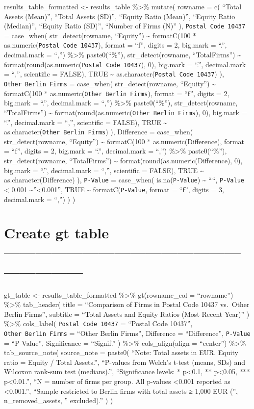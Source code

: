 \documentclass[
]{article}
\begin{document}
results\_table\_formatted \textless- results\_table \%\textgreater\%
mutate( rowname = c( ``Total Assets (Mean)'', ``Total Assets (SD)'',
``Equity Ratio (Mean)'', ``Equity Ratio (Median)'', ``Equity Ratio
(SD)'', ``Number of Firms (N)'' ), \texttt{Postal\ Code\ 10437} =
case\_when( str\_detect(rowname, ``Equity'') \textasciitilde{}
formatC(100 * as.numeric(\texttt{Postal\ Code\ 10437}), format = ``f'',
digits = 2, big.mark = ``.'', decimal.mark = ``,'') \%\textgreater\%
paste0(``\%''), str\_detect(rowname, ``Total\textbar Firms'')
\textasciitilde{} format(round(as.numeric(\texttt{Postal\ Code\ 10437}),
0), big.mark = ``.'', decimal.mark = ``,'', scientific = FALSE), TRUE
\textasciitilde{} as.character(\texttt{Postal\ Code\ 10437}) ),
\texttt{Other\ Berlin\ Firms} = case\_when( str\_detect(rowname,
``Equity'') \textasciitilde{} formatC(100 *
as.numeric(\texttt{Other\ Berlin\ Firms}), format = ``f'', digits = 2,
big.mark = ``.'', decimal.mark = ``,'') \%\textgreater\% paste0(``\%''),
str\_detect(rowname, ``Total\textbar Firms'') \textasciitilde{}
format(round(as.numeric(\texttt{Other\ Berlin\ Firms}), 0), big.mark =
``.'', decimal.mark = ``,'', scientific = FALSE), TRUE \textasciitilde{}
as.character(\texttt{Other\ Berlin\ Firms}) ), Difference = case\_when(
str\_detect(rowname, ``Equity'') \textasciitilde{} formatC(100 *
as.numeric(Difference), format = ``f'', digits = 2, big.mark = ``.'',
decimal.mark = ``,'') \%\textgreater\% paste0(``\%''),
str\_detect(rowname, ``Total\textbar Firms'') \textasciitilde{}
format(round(as.numeric(Difference), 0), big.mark = ``.'', decimal.mark
= ``,'', scientific = FALSE), TRUE \textasciitilde{}
as.character(Difference) ), \texttt{P-Value} = case\_when(
is.na(\texttt{P-Value}) \textasciitilde{} ````, \texttt{P-Value}
\textless{} 0.001 \textasciitilde{}''\textless0.001'', TRUE
\textasciitilde{} formatC(\texttt{P-Value}, format = ``f'', digits = 3,
decimal.mark = ``,'') ) )

\hypertarget{create-gt-table}{%
\section{Create gt table
------------------------------------------------------------}\label{create-gt-table}}

gt\_table \textless- results\_table\_formatted \%\textgreater\%
gt(rowname\_col = ``rowname'') \%\textgreater\% tab\_header( title =
``Comparison of Firms in Postal Code 10437 vs.~Other Berlin Firms'',
subtitle = ``Total Assets and Equity Ratios (Most Recent Year)'' )
\%\textgreater\% cols\_label( \texttt{Postal\ Code\ 10437} = ``Postal
Code 10437'', \texttt{Other\ Berlin\ Firms} = ``Other Berlin Firms'',
Difference = ``Difference'', \texttt{P-Value} = ``P-Value'',
Significance = ``Signif.'' ) \%\textgreater\% cols\_align(align =
``center'') \%\textgreater\% tab\_source\_note( source\_note = paste0(
``Note: Total assets in EUR. Equity ratio = Equity / Total Assets.'',
``P-values from Welch's t-test (means, SDs) and Wilcoxon rank-sum test
(medians).'', ``Significance levels: * p\textless0.1, ** p\textless0.05,
*** p\textless0.01.'', ``N = number of firms per group. All p-values
\textless0.001 reported as \textless0.001.'', ``Sample restricted to
Berlin firms with total assets ≥ 1,000 EUR ('', n\_removed\_assets, ''
excluded).'' ) )
\end{document}
